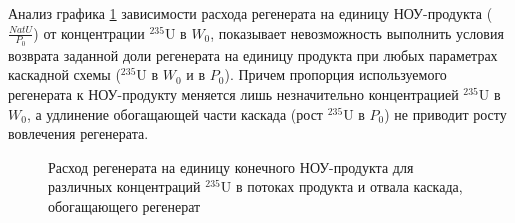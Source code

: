 Анализ графика \ref{Figure_10} зависимости расхода регенерата на единицу НОУ-продукта ($\frac{NatU}{P_{0}}$) от концентрации $^{235}$U в $W_0$, показывает невозможность выполнить условия возврата заданной доли регенерата на единицу продукта при любых параметрах каскадной схемы ($^{235}$U в $W_0$ и в $P_0$). Причем пропорция используемого регенерата к НОУ-продукту меняется лишь незначительно концентрацией $^{235}$U в $W_0$, а удлинение обогащающей части каскада (рост $^{235}$U в $P_0$) не приводит росту вовлечения регенерата.

\begin{figure}[ht]
  \caption{Расход регенерата на единицу конечного НОУ-продукта для различных концентраций $^{235}$U в потоках продукта и отвала каскада, обогащающего регенерат}\label{Figure_10}
\end{figure}



